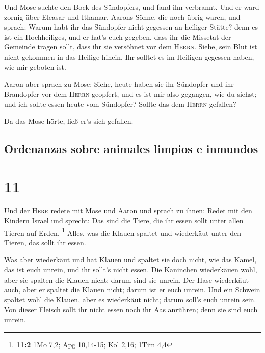 Und Mose suchte den Bock des Sündopfers, und fand ihn
verbrannt. Und er ward zornig über Eleasar und Ithamar, Aarons Söhne,
die noch übrig waren, und sprach:  Warum habt ihr das
Sündopfer nicht gegessen an heiliger Stätte? denn es ist ein
Hochheiliges, und er hat's euch gegeben, dass ihr die Missetat der
Gemeinde tragen sollt, dass ihr sie versöhnet vor dem \textsc{Herrn}.
 Siehe, sein Blut ist nicht gekommen in das Heilige
hinein. Ihr solltet es im Heiligen gegessen haben, wie mir geboten ist.

 Aaron aber sprach zu Mose: Siehe, heute haben sie ihr
Sündopfer und ihr Brandopfer vor dem \textsc{Herrn} geopfert, und es ist
mir also gegangen, wie du siehst; und ich sollte essen heute vom
Sündopfer? Sollte das dem \textsc{Herrn} gefallen?

 Da das Mose hörte, ließ er's sich gefallen.

\hypertarget{ordenanzas-sobre-animales-limpios-e-inmundos}{%
\subsection{Ordenanzas sobre animales limpios e
inmundos}\label{ordenanzas-sobre-animales-limpios-e-inmundos}}

\hypertarget{section-10}{%
\section{11}\label{section-10}}

 Und der \textsc{Herr} redete mit Mose und Aaron und
sprach zu ihnen:  Redet mit den Kindern Israel und
sprecht: Das sind die Tiere, die ihr essen sollt unter allen Tieren auf
Erden. \footnote{\textbf{11:2} 1Mo 7,2; Apg 10,14-15; Kol 2,16; 1Tim 4,4}
 Alles, was die Klauen spaltet und wiederkäut unter den
Tieren, das sollt ihr essen.

 Was aber wiederkäut und hat Klauen und spaltet sie doch
nicht, wie das Kamel, das ist euch unrein, und ihr sollt's nicht essen.
 Die Kaninchen wiederkäuen wohl, aber sie spalten die
Klauen nicht; darum sind sie unrein.  Der Hase wiederkäut
auch, aber er spaltet die Klauen nicht; darum ist er euch unrein.
 Und ein Schwein spaltet wohl die Klauen, aber es
wiederkäut nicht; darum soll's euch unrein sein.  Von
dieser Fleisch sollt ihr nicht essen noch ihr Aas anrühren; denn sie
sind euch unrein.

